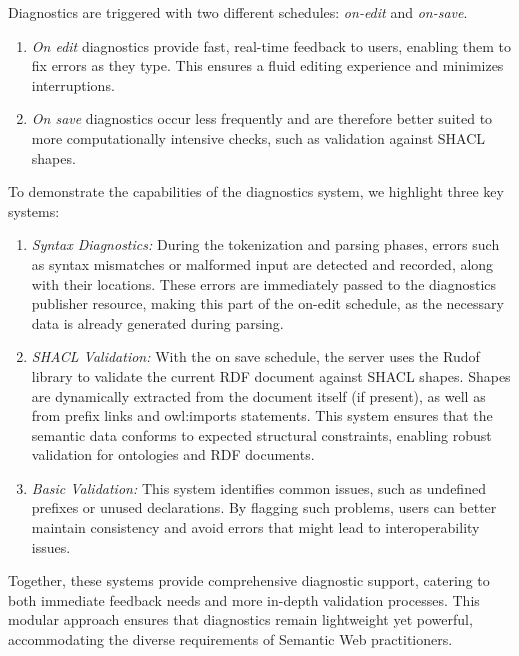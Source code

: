 Diagnostics are triggered with two different schedules: \textit{on-edit} and \textit{on-save}.

\begin{enumerate}
  \item \textit{On edit} diagnostics provide fast, real-time feedback to users, enabling them to fix errors as they type. 
    This ensures a fluid editing experience and minimizes interruptions.
  \item \textit{On save} diagnostics occur less frequently and are therefore better suited to more computationally intensive checks,
   such as validation against SHACL shapes.
\end{enumerate}

To demonstrate the capabilities of the diagnostics system, we highlight three key systems:

\begin{enumerate}
  \item \textit{Syntax Diagnostics:}
    During the tokenization and parsing phases, errors such as syntax mismatches or malformed input are detected and recorded, along with their locations.
    These errors are immediately passed to the diagnostics publisher resource, making this part of the on-edit schedule, as the necessary data is already generated during parsing.
  \item \textit{SHACL Validation:} 
    With the on save schedule, the server uses the Rudof library to validate the current RDF document against SHACL shapes.
    Shapes are dynamically extracted from the document itself (if present), as well as from prefix links and owl:imports statements.
    This system ensures that the semantic data conforms to expected structural constraints, enabling robust validation for ontologies and RDF documents.
  \item \textit{Basic Validation:}
    This system identifies common issues, such as undefined prefixes or unused declarations.
    By flagging such problems, users can better maintain consistency and avoid errors that might lead to interoperability issues.
\end{enumerate}

Together, these systems provide comprehensive diagnostic support, catering to both immediate feedback needs and more in-depth validation processes.
This modular approach ensures that diagnostics remain lightweight yet powerful, accommodating the diverse requirements of Semantic Web practitioners.


